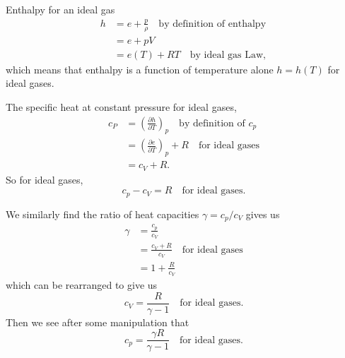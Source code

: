 \begin{node}
Enthalpy for an ideal gas
\begin{subequations}
  \begin{align}
h &= e + \frac{p}{\rho}\quad\mbox{by definition of enthalpy}\\
&= e + pV\\
&= e(T) + RT\quad\mbox{by ideal gas Law},
  \end{align}
\end{subequations}
which means that enthalpy is a function of temperature alone $h=h(T)$
for ideal gases.
\end{node}

\begin{node}
The specific heat at constant pressure for ideal gases,
\begin{subequations}
  \begin{align}
c_{P} &= \left(\frac{\partial h}{\partial T}\right)_{p}\quad\mbox{by
  definition of $c_{p}$}\\
&= \left(\frac{\partial e}{\partial T}\right)_{p} + R\quad\mbox{for
  ideal gases}\\
&= c_{V} + R.
  \end{align}
\end{subequations}
So for ideal gases,
\begin{equation}
\boxed{c_{p}-c_{V}=R\quad\mbox{for ideal gases}.}
\end{equation}
\end{node}

\begin{node}
We similarly find the ratio of heat capacities $\gamma=c_{p}/c_{V}$
gives us
\begin{subequations}
  \begin{align}
    \gamma &= \frac{c_{p}}{c_{V}}\\
    &= \frac{c_{V}+R}{c_{V}}\quad\mbox{for ideal gases}\\
    &= 1 + \frac{R}{c_{V}}
  \end{align}
\end{subequations}
which can be rearranged to give us
\begin{equation}
\boxed{c_{V} = \frac{R}{\gamma-1}\quad\mbox{for ideal gases}.}
\end{equation}
Then we see after some manipulation that
\begin{equation}
\boxed{c_{p}=\frac{\gamma R}{\gamma-1}\quad\mbox{for ideal gases}.}
\end{equation}
\end{node}

